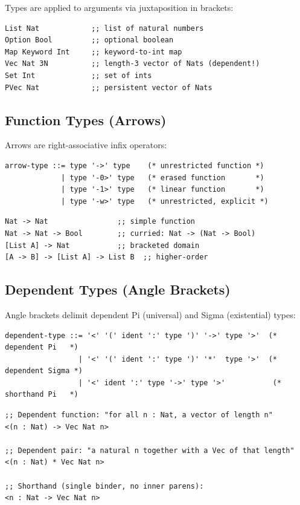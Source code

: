 \documentclass[11pt]{article}
\begin{document}
Types are applied to arguments via juxtaposition in brackets:

\begin{verbatim}
List Nat            ;; list of natural numbers
Option Bool         ;; optional boolean
Map Keyword Int     ;; keyword-to-int map
Vec Nat 3N          ;; length-3 vector of Nats (dependent!)
Set Int             ;; set of ints
PVec Nat            ;; persistent vector of Nats
\end{verbatim}
\subsection{Function Types (Arrows)}
\label{sec:org565b9c6}

Arrows are right-associative infix operators:

\begin{verbatim}
arrow-type ::= type '->' type    (* unrestricted function *)
             | type '-0>' type   (* erased function       *)
             | type '-1>' type   (* linear function       *)
             | type '-w>' type   (* unrestricted, explicit *)
\end{verbatim}

\begin{verbatim}
Nat -> Nat                ;; simple function
Nat -> Nat -> Bool        ;; curried: Nat -> (Nat -> Bool)
[List A] -> Nat           ;; bracketed domain
[A -> B] -> [List A] -> List B  ;; higher-order
\end{verbatim}
\subsection{Dependent Types (Angle Brackets)}
\label{sec:orgb1acb83}

Angle brackets delimit dependent Pi (universal) and Sigma (existential) types:

\begin{verbatim}
dependent-type ::= '<' '(' ident ':' type ')' '->' type '>'  (* dependent Pi   *)
                 | '<' '(' ident ':' type ')' '*'  type '>'  (* dependent Sigma *)
                 | '<' ident ':' type '->' type '>'           (* shorthand Pi   *)
\end{verbatim}

\begin{verbatim}
;; Dependent function: "for all n : Nat, a vector of length n"
<(n : Nat) -> Vec Nat n>

;; Dependent pair: "a natural n together with a Vec of that length"
<(n : Nat) * Vec Nat n>

;; Shorthand (single binder, no inner parens):
<n : Nat -> Vec Nat n>
\end{verbatim}
\end{document}
